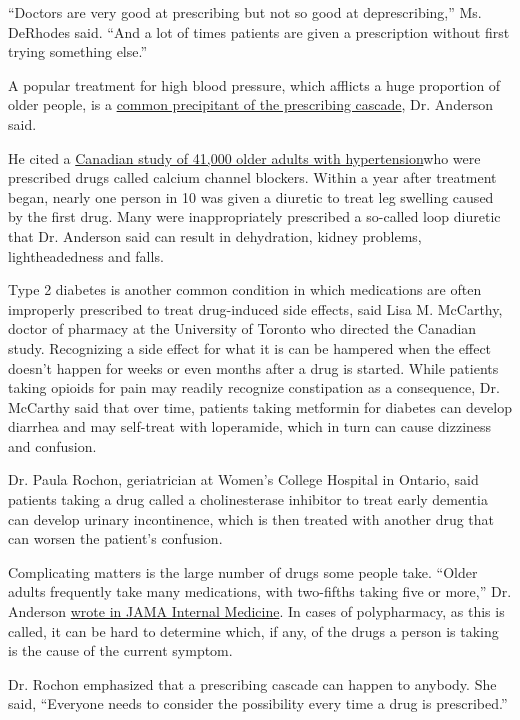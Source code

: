 ``Doctors are very good at prescribing but not so good at
deprescribing,'' Ms. DeRhodes said. ``And a lot of times patients are
given a prescription without first trying something else.''

A popular treatment for high blood pressure, which afflicts a huge
proportion of older people, is a
\href{https://jamanetwork.com/journals/jamainternalmedicine/article-abstract/2761267}{common
precipitant of the prescribing cascade}, Dr. Anderson said.

He cited a
\href{https://jamanetwork.com/journals/jamainternalmedicine/article-abstract/2761272}{Canadian
study of 41,000 older adults with hypertension}who were prescribed drugs
called calcium channel blockers. Within a year after treatment began,
nearly one person in 10 was given a diuretic to treat leg swelling
caused by the first drug. Many were inappropriately prescribed a
so-called loop diuretic that Dr. Anderson said can result in
dehydration, kidney problems, lightheadedness and falls.

Type 2 diabetes is another common condition in which medications are
often improperly prescribed to treat drug-induced side effects, said
Lisa M. McCarthy, doctor of pharmacy at the University of Toronto who
directed the Canadian study. Recognizing a side effect for what it is
can be hampered when the effect doesn't happen for weeks or even months
after a drug is started. While patients taking opioids for pain may
readily recognize constipation as a consequence, Dr. McCarthy said that
over time, patients taking metformin for diabetes can develop diarrhea
and may self-treat with loperamide, which in turn can cause dizziness
and confusion.

Dr. Paula Rochon, geriatrician at Women's College Hospital in Ontario,
said patients taking a drug called a cholinesterase inhibitor to treat
early dementia can develop urinary incontinence, which is then treated
with another drug that can worsen the patient's confusion.

Complicating matters is the large number of drugs some people take.
``Older adults frequently take many medications, with two-fifths taking
five or more,'' Dr. Anderson
\href{https://jamanetwork.com/journals/jamainternalmedicine/article-abstract/2761267}{wrote
in JAMA Internal Medicine}. In cases of polypharmacy, as this is called,
it can be hard to determine which, if any, of the drugs a person is
taking is the cause of the current symptom.

Dr. Rochon emphasized that a prescribing cascade can happen to anybody.
She said, ``Everyone needs to consider the possibility every time a drug
is prescribed.''

